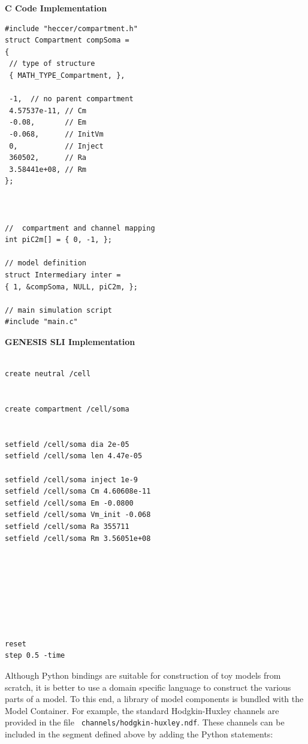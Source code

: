 \documentclass[10pt]{article}
\begin{document}
{ 
  \begin{minipage}{1\linewidth}
    
    \begin{minipage}[t]{.50\linewidth}
    \vspace*{2mm} 
{\bf C Code Implementation}
\begin{verbatim}
#include "heccer/compartment.h"
struct Compartment compSoma =
{
 // type of structure
 { MATH_TYPE_Compartment, },

 -1,  // no parent compartment
 4.57537e-11, // Cm
 -0.08,       // Em
 -0.068,      // InitVm
 0,           // Inject
 360502,      // Ra
 3.58441e+08, // Rm
};



//  compartment and channel mapping
int piC2m[] = { 0, -1, };

// model definition
struct Intermediary inter =
{ 1, &compSoma, NULL, piC2m, };

// main simulation script
#include "main.c"

\end{verbatim}
    \end{minipage}
    \vspace*{2mm} 
    \begin{minipage}[t]{.50\linewidth}
    \vspace*{2mm} 
{\bf GENESIS SLI Implementation}
\begin{verbatim}

create neutral /cell


create compartment /cell/soma


setfield /cell/soma dia 2e-05
setfield /cell/soma len 4.47e-05

setfield /cell/soma inject 1e-9
setfield /cell/soma Cm 4.60608e-11
setfield /cell/soma Em -0.0800
setfield /cell/soma Vm_init -0.068
setfield /cell/soma Ra 355711
setfield /cell/soma Rm 3.56051e+08








reset
step 0.5 -time
\end{verbatim}
    \end{minipage}
  \end{minipage}
    \vspace*{1mm}
}

Although Python bindings are suitable for construction of toy models from
scratch, it is better to use a domain specific language to construct
the various parts of a model. To this end, a library of model components is bundled with the Model Container.  For example, the
standard Hodgkin-Huxley channels are provided in the file {\tt
  channels/hodgkin-huxley.ndf}.  These channels can be included in the
segment defined above by adding the Python statements:
\end{document}
